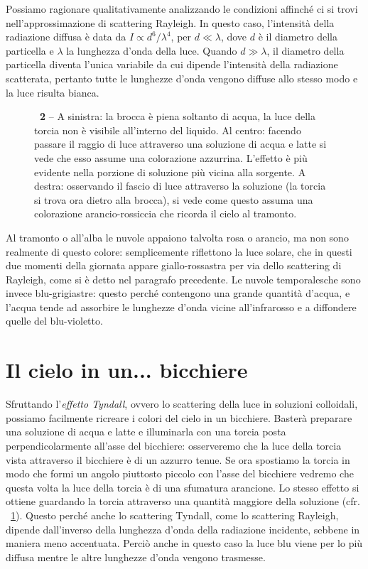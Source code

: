Possiamo ragionare qualitativamente analizzando le condizioni affinché ci si trovi nell'approssimazione di scattering Rayleigh. In questo caso, l'intensità della radiazione diffusa è data da $I\propto d^6/\lambda^4$, per $d\ll\lambda$, dove $d$ è il diametro della particella e $\lambda$ la lunghezza d'onda della luce. Quando $d\gg\lambda$, il diametro della particella diventa l'unica variabile da cui dipende l'intensità della radiazione scatterata, pertanto tutte le lunghezze d'onda vengono diffuse allo stesso modo e la luce risulta bianca.

\begin{figure}[!b]
\begin{center}
\caption{\textbf{\figurename~2} -- A sinistra: la brocca è piena soltanto di acqua, la luce della torcia non è visibile all'interno del liquido. Al centro: facendo passare il raggio di luce attraverso una soluzione di acqua e latte si vede che esso assume una colorazione azzurrina. L'effetto è più evidente nella porzione di soluzione più vicina alla sorgente. A destra: osservando il fascio di luce attraverso la soluzione (la torcia si trova ora dietro alla brocca), si vede come questo assuma una colorazione arancio-rossiccia che ricorda il cielo al tramonto.}
\label{fig:esperimento}
\end{center}
\vskip-20pt
\end{figure}

Al tramonto o all'alba le nuvole appaiono talvolta rosa o arancio, ma non sono realmente di questo colore: semplicemente riflettono la luce solare, che in questi due momenti della giornata appare giallo-rossastra per via dello scattering di Rayleigh, come si è detto nel paragrafo precedente.
Le nuvole temporalesche sono invece blu-grigiastre: questo perché contengono una grande quantità d'acqua, e l'acqua tende ad assorbire le lunghezze d'onda vicine all'infrarosso e a diffondere quelle del blu-violetto.

\section*{Il cielo in un... bicchiere}
Sfruttando l'\emph{effetto Tyndall}, ovvero lo scattering della luce in soluzioni colloidali, possiamo facilmente ricreare i colori del cielo in un bicchiere. 
Basterà preparare una soluzione di acqua e latte e illuminarla con una torcia posta perpendicolarmente all'asse del bicchiere: osserveremo che la luce della torcia vista attraverso il bicchiere è di un azzurro tenue. Se ora spostiamo la torcia in modo che formi un angolo piuttosto piccolo con l'asse del bicchiere vedremo che questa volta la luce della torcia è di una sfumatura arancione. Lo stesso effetto si ottiene guardando la torcia attraverso una quantità maggiore della soluzione (cfr. \figurename~\ref{fig:esperimento}).
Questo perché anche lo scattering Tyndall, come lo scattering Rayleigh, dipende dall'inverso della lunghezza d'onda della radiazione incidente, sebbene in maniera meno accentuata. Perciò anche in questo caso la luce blu viene per lo più diffusa mentre le altre lunghezze d'onda vengono trasmesse.

